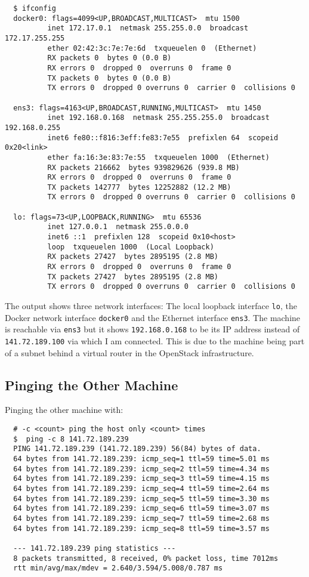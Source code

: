 \begin{verbatim}
  $ ifconfig
  docker0: flags=4099<UP,BROADCAST,MULTICAST>  mtu 1500
          inet 172.17.0.1  netmask 255.255.0.0  broadcast 172.17.255.255
          ether 02:42:3c:7e:7e:6d  txqueuelen 0  (Ethernet)
          RX packets 0  bytes 0 (0.0 B)
          RX errors 0  dropped 0  overruns 0  frame 0
          TX packets 0  bytes 0 (0.0 B)
          TX errors 0  dropped 0 overruns 0  carrier 0  collisions 0

  ens3: flags=4163<UP,BROADCAST,RUNNING,MULTICAST>  mtu 1450
          inet 192.168.0.168  netmask 255.255.255.0  broadcast 192.168.0.255
          inet6 fe80::f816:3eff:fe83:7e55  prefixlen 64  scopeid 0x20<link>
          ether fa:16:3e:83:7e:55  txqueuelen 1000  (Ethernet)
          RX packets 216662  bytes 939829626 (939.8 MB)
          RX errors 0  dropped 0  overruns 0  frame 0
          TX packets 142777  bytes 12252882 (12.2 MB)
          TX errors 0  dropped 0 overruns 0  carrier 0  collisions 0

  lo: flags=73<UP,LOOPBACK,RUNNING>  mtu 65536
          inet 127.0.0.1  netmask 255.0.0.0
          inet6 ::1  prefixlen 128  scopeid 0x10<host>
          loop  txqueuelen 1000  (Local Loopback)
          RX packets 27427  bytes 2895195 (2.8 MB)
          RX errors 0  dropped 0  overruns 0  frame 0
          TX packets 27427  bytes 2895195 (2.8 MB)
          TX errors 0  dropped 0 overruns 0  carrier 0  collisions 0
\end{verbatim}

The output shows three network interfaces: The local loopback interface \texttt{lo}, the Docker network interface \texttt{docker0} and the Ethernet interface \texttt{ens3}.
The machine is reachable via \texttt{ens3} but it shows \texttt{192.168.0.168} to be its IP address instead of \texttt{141.72.189.100} via which I am connected.
This is due to the machine being part of a subnet behind a virtual router in the OpenStack infrastructure.

\subsection{Pinging the Other Machine}

Pinging the other machine with:

\begin{verbatim}
  # -c <count> ping the host only <count> times
  $  ping -c 8 141.72.189.239
  PING 141.72.189.239 (141.72.189.239) 56(84) bytes of data.
  64 bytes from 141.72.189.239: icmp_seq=1 ttl=59 time=5.01 ms
  64 bytes from 141.72.189.239: icmp_seq=2 ttl=59 time=4.34 ms
  64 bytes from 141.72.189.239: icmp_seq=3 ttl=59 time=4.15 ms
  64 bytes from 141.72.189.239: icmp_seq=4 ttl=59 time=2.64 ms
  64 bytes from 141.72.189.239: icmp_seq=5 ttl=59 time=3.30 ms
  64 bytes from 141.72.189.239: icmp_seq=6 ttl=59 time=3.07 ms
  64 bytes from 141.72.189.239: icmp_seq=7 ttl=59 time=2.68 ms
  64 bytes from 141.72.189.239: icmp_seq=8 ttl=59 time=3.57 ms

  --- 141.72.189.239 ping statistics ---
  8 packets transmitted, 8 received, 0% packet loss, time 7012ms
  rtt min/avg/max/mdev = 2.640/3.594/5.008/0.787 ms
\end{verbatim}

